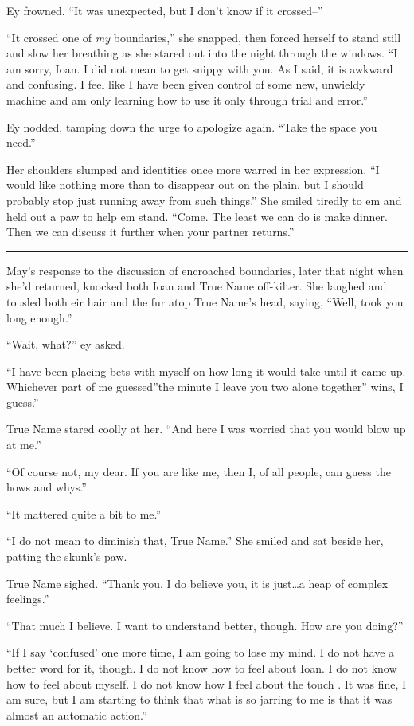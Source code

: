 Ey frowned. ``It was unexpected, but I don't know if it crossed--''

``It crossed one of \emph{my} boundaries,'' she snapped, then forced herself to stand still and slow her breathing as she stared out into the night through the windows. ``I am sorry, Ioan. I did not mean to get snippy with you. As I said, it is awkward and confusing. I feel like I have been given control of some new, unwieldy machine and am only learning how to use it only through trial and error.''

Ey nodded, tamping down the urge to apologize again. ``Take the space you need.''

Her shoulders slumped and identities once more warred in her expression. ``I would like nothing more than to disappear out on the plain, but I should probably stop just running away from such things.'' She smiled tiredly to em and held out a paw to help em stand. ``Come. The least we can do is make dinner. Then we can discuss it further when your partner returns.''

\begin{center}\rule{0.5\linewidth}{0.5pt}\end{center}

May's response to the discussion of encroached boundaries, later that night when she'd returned, knocked both Ioan and True Name off-kilter. She laughed and tousled both eir hair and the fur atop True Name's head, saying, ``Well, took you long enough.''

``Wait, what?'' ey asked.

``I have been placing bets with myself on how long it would take until it came up. Whichever part of me guessed''the minute I leave you two alone together'' wins, I guess.''

True Name stared coolly at her. ``And here I was worried that you would blow up at me.''

``Of course not, my dear. If you are like me, then I, of all people, can guess the hows and whys.''

``It mattered quite a bit to me.''

``I do not mean to diminish that, True Name.'' She smiled and sat beside her, patting the skunk's paw.

True Name sighed. ``Thank you, I do believe you, it is just\ldots a heap of complex feelings.''

``That much I believe. I want to understand better, though. How are you doing?''

``If I say `confused' one more time, I am going to lose my mind. I do not have a better word for it, though. I do not know how to feel about Ioan. I do not know how to feel about myself. I do not know how I feel about the touch . It was fine, I am sure, but I am starting to think that what is so jarring to me is that it was almost an automatic action.''

